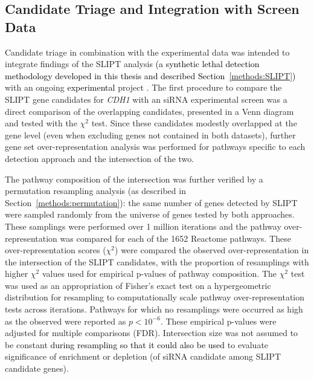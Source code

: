 \subsection{Candidate Triage and Integration with Screen Data} \label{methods:venn_analysis}
Candidate triage in combination with the experimental data was intended to integrate findings of the \gls{SLIPT} analysis \textcolor{black}{(a synthetic lethal detection methodology developed in this thesis and described Section~\ref{methods:SLIPT})} with an ongoing \textcolor{black}{experimental} project \citep{Chen2014, Telford2015}. The first procedure to compare the \gls{SLIPT} gene candidates for \textit{CDH1} with an \gls{siRNA} experimental screen \citep{Telford2015} was a direct comparison of the overlapping candidates, presented in a Venn diagram and tested with the $\chi^2$ test. Since these candidates modestly overlapped at the gene level (even when excluding genes not contained in both datasets), further gene set over-representation analysis was performed for pathways specific to each detection approach and the intersection of the two.

The \gls{pathway} composition of the intersection was further verified by a permutation resampling analysis (as described in Section~\ref{methods:permutation}): the same number of genes detected by \gls{SLIPT} were sampled randomly from the universe of genes tested by both approaches. These samplings were performed over 1 million iterations and the \gls{pathway} over-representation was compared for each of the 1652 Reactome \glspl{pathway}.
These over-representation scores ($\chi^2$) were compared the observed over-representation in the intersection of the \gls{SLIPT} candidates, with the proportion of resamplings with higher $\chi^2$ values used for empirical p-values of \gls{pathway} composition. The $\chi^2$ test was used as an appropriation of Fisher's exact test on a hypergeometric distribution for resampling to computationally scale \gls{pathway} over-representation tests across iterations.  Pathways for which no resamplings were occurred as high as the observed were reported as $p < 10^{-6}$. These empirical p-values were adjusted for multiple comparisons (\gls{FDR}). Intersection size was not assumed to be constant \textcolor{black}{during resampling so that it could also be used} to evaluate significance of enrichment or depletion (of \gls{siRNA} candidate among \gls{SLIPT} candidate genes).  

